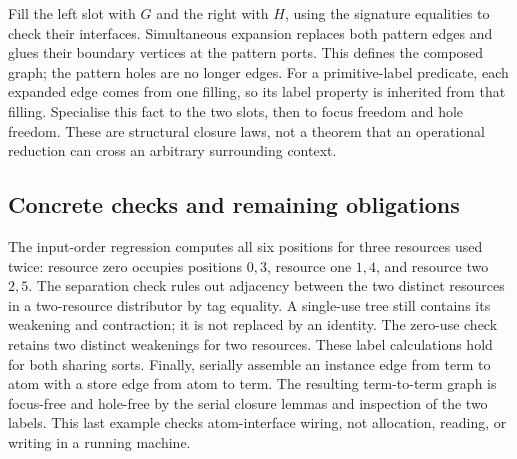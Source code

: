 


Fill the left slot with $G$ and the right with $H$, using the signature
equalities to check their interfaces. Simultaneous expansion replaces both
pattern edges and glues their boundary vertices at the pattern ports.
This defines the composed graph; the pattern holes are no longer edges.
For a primitive-label predicate, each expanded edge comes from one filling,
so its label property is inherited from that filling. Specialise this fact
to the two slots, then to focus freedom and hole freedom. These are structural
closure laws, not a theorem that an operational reduction can cross an
arbitrary surrounding context.







\subsection{Concrete checks and remaining obligations}

The input-order regression computes all six positions for three resources
used twice: resource zero occupies positions $0,3$, resource one $1,4$,
and resource two $2,5$. The separation check rules out adjacency between
the two distinct resources in a two-resource distributor by tag equality.
A single-use tree still contains its weakening and contraction; it is not
replaced by an identity. The zero-use check retains two distinct weakenings
for two resources. These label calculations hold for both sharing sorts.
Finally, serially assemble an instance edge from term to atom with a store
edge from atom to term. The resulting term-to-term graph is focus-free and
hole-free by the serial closure lemmas and inspection of the two labels.
This last example checks atom-interface wiring, not allocation, reading,
or writing in a running machine.

